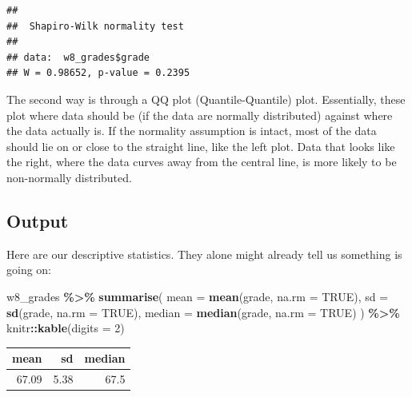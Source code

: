 \documentclass[
]{book}
\newenvironment{Shaded}{\begin{snugshade}}{\end{snugshade}}
\newcommand{\AttributeTok}[1]{\textcolor[rgb]{0.13,0.29,0.53}{#1}}
\newcommand{\ConstantTok}[1]{\textcolor[rgb]{0.56,0.35,0.01}{#1}}
\newcommand{\DecValTok}[1]{\textcolor[rgb]{0.00,0.00,0.81}{#1}}
\newcommand{\FunctionTok}[1]{\textcolor[rgb]{0.13,0.29,0.53}{\textbf{#1}}}
\newcommand{\NormalTok}[1]{#1}
\newcommand{\SpecialCharTok}[1]{\textcolor[rgb]{0.81,0.36,0.00}{\textbf{#1}}}
\begin{document}
\begin{Shaded}
\end{Shaded}

\begin{verbatim}
## 
##  Shapiro-Wilk normality test
## 
## data:  w8_grades$grade
## W = 0.98652, p-value = 0.2395
\end{verbatim}

The second way is through a QQ plot (Quantile-Quantile) plot. Essentially, these plot where data should be (if the data are normally distributed) against where the data actually is. If the normality assumption is intact, most of the data should lie on or close to the straight line, like the left plot. Data that looks like the right, where the data curves away from the central line, is more likely to be non-normally distributed.



\subsection{Output}\label{output-2}

Here are our descriptive statistics. They alone might already tell us something is going on:

\begin{Shaded}
\begin{Highlighting}[]
\NormalTok{w8\_grades }\SpecialCharTok{\%\textgreater{}\%}
  \FunctionTok{summarise}\NormalTok{(}
    \AttributeTok{mean =} \FunctionTok{mean}\NormalTok{(grade, }\AttributeTok{na.rm =} \ConstantTok{TRUE}\NormalTok{),}
    \AttributeTok{sd =} \FunctionTok{sd}\NormalTok{(grade, }\AttributeTok{na.rm =} \ConstantTok{TRUE}\NormalTok{),}
    \AttributeTok{median =} \FunctionTok{median}\NormalTok{(grade, }\AttributeTok{na.rm =} \ConstantTok{TRUE}\NormalTok{)}
\NormalTok{  ) }\SpecialCharTok{\%\textgreater{}\%}
\NormalTok{  knitr}\SpecialCharTok{::}\FunctionTok{kable}\NormalTok{(}\AttributeTok{digits =} \DecValTok{2}\NormalTok{)}
\end{Highlighting}
\end{Shaded}

\begin{tabular}{r|r|r}
\hline
mean & sd & median\\
\hline
67.09 & 5.38 & 67.5\\
\hline
\end{tabular}
\end{document}

